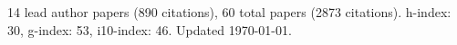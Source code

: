 14 lead author papers (890 citations),
60 total papers (2873 citations).\newline
h-index: 30, g-index: 53, i10-index: 46. Updated \today.